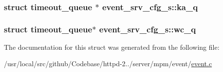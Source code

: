 \subsubsection[{\texorpdfstring{ka\+\_\+q}{ka_q}}]{\setlength{\rightskip}{0pt plus 5cm}struct {\bf timeout\+\_\+queue} $\ast$ event\+\_\+srv\+\_\+cfg\+\_\+s\+::ka\+\_\+q}\hypertarget{structevent__srv__cfg__s_abe7b6b4207b43e62677afcc285e80676}{}\label{structevent__srv__cfg__s_abe7b6b4207b43e62677afcc285e80676}
\subsubsection[{\texorpdfstring{wc\+\_\+q}{wc_q}}]{\setlength{\rightskip}{0pt plus 5cm}struct {\bf timeout\+\_\+queue}$\ast$ event\+\_\+srv\+\_\+cfg\+\_\+s\+::wc\+\_\+q}\hypertarget{structevent__srv__cfg__s_afb525a3542e3096651786d1604ab7485}{}\label{structevent__srv__cfg__s_afb525a3542e3096651786d1604ab7485}


The documentation for this struct was generated from the following file\+:\begin{DoxyCompactItemize}
\item 
/usr/local/src/github/\+Codebase/httpd-\/2../server/mpm/event/\hyperlink{event_8c}{event.\+c}\end{DoxyCompactItemize}
